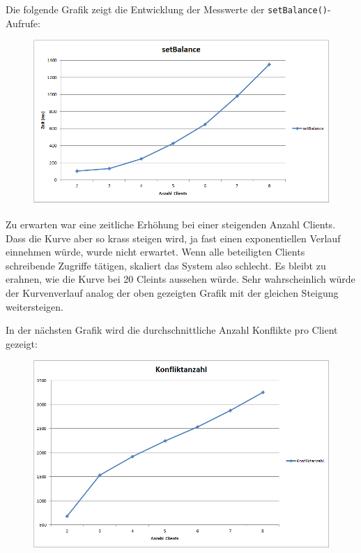 Die folgende Grafik zeigt die Entwicklung der Messwerte der \texttt{setBalance()}-Aufrufe:
\begin{figure}[H]
\begin{center}
\includegraphics[scale=0.6]{images_MessErgebnisse/incrementCacheSetBalance.png}
\end{center}
\end{figure}

Zu erwarten war eine zeitliche Erhöhung bei einer steigenden Anzahl Clients. Dass die Kurve aber so krass steigen wird, ja fast einen exponentiellen Verlauf einnehmen würde, wurde nicht erwartet. Wenn alle beteiligten Clients schreibende Zugriffe tätigen, skaliert das System also schlecht. Es bleibt zu erahnen, wie die Kurve bei 20 Cleints aussehen würde. Sehr wahrscheinlich würde der Kurvenverlauf analog der oben gezeigten Grafik mit der gleichen Steigung weitersteigen. \newline

In der nächsten Grafik wird die durchschnittliche Anzahl Konflikte pro Client gezeigt:
\begin{figure}[H]
\begin{center}
\includegraphics[scale=0.6]{images_MessErgebnisse/incrementCacheKonfliktzahl.png}
\end{center}
\end{figure}


